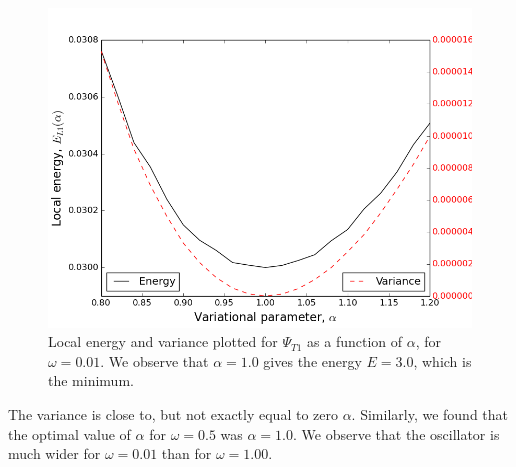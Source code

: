 \documentclass[norsk,a4paper,12pt]{article}
\begin{document}
\begin{figure} [H]
    \centering
    \includegraphics[scale=0.65]{E_L1_variance_omega=0_01_1e8.png}
    \caption{Local energy and variance plotted  for $\Psi_{T1}$ as a function of $\alpha$, for $\omega = 0.01$. We observe that $\alpha = 1.0$ gives the energy $E=3.0$, which is the minimum.}
    \label{fig:E_L1_file_omega=0_01}
\end{figure} 
The variance is close to, but not exactly equal to zero $\alpha$. Similarly, we found that the optimal value of $\alpha$ for $\omega = 0.5$ was $\alpha = 1.0$. We observe that the oscillator is much wider for $\omega=0.01$ than for $\omega=1.00$.
\end{document}
